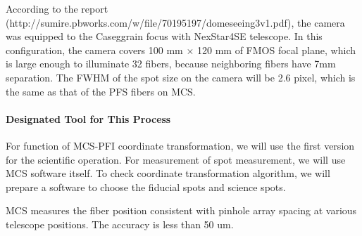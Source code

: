According to the report (http://sumire.pbworks.com/w/file/70195197/domeseeing3v1.pdf), the camera was equipped to the Caseggrain focus with NexStar4SE telescope.
In this configuration, the camera covers 100 mm $\times$ 120 mm of FMOS focal plane, which is large enough to illuminate 32 fibers, because neighboring fibers have 7mm separation.
The FWHM of the spot size on the camera will be 2.6 pixel, which is the same as that of the PFS fibers on MCS.

\paragraph{Designated Tool for This Process}
For function of MCS-PFI coordinate transformation, we will use the first version for the scientific operation.
For measurement of spot measurement, we will use MCS software itself.
To check coordinate transformation algorithm, we will prepare a software to choose the fiducial spots and science spots.

\begin{itembox}[l]{}
MCS measures the fiber position consistent with pinhole array spacing at various telescope positions. 
The accuracy is less than 50 um.

\end{itembox}